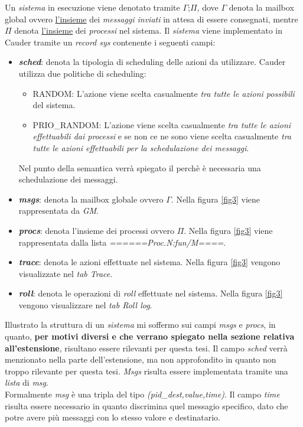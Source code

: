 \documentclass[background.tex]{subfiles}
\begin{document}
Un \textit{sistema} in esecuzione viene denotato tramite $\Gamma$;$\Pi$, dove $\Gamma$ denota la mailbox global ovvero \underline{l'insieme} dei \textit{messaggi inviati} in attesa di essere consegnati, mentre $\Pi$ denota \underline{l'insieme} dei \textit{processi} nel sistema.
Il \textit{sistema} viene implementato in Cauder tramite un \textit{record sys} contenente i seguenti campi:
	\begin{itemize}
		\item \textit{\textbf{sched}}: denota la tipologia di scheduling delle azioni da utilizzare. Cauder utilizza due politiche di scheduling:
			\begin{itemize}
				\item RANDOM: L'azione viene scelta casualmente \textit{tra tutte le azioni possibili} del sistema.
				\item PRIO\_RANDOM: L'azione viene scelta casualmente \textit{tra tutte le azioni effettuabili dai processi} e se non ce ne sono viene scelta casualmente \textit{tra tutte le azioni effettuabili per la schedulazione dei messaggi}.
			\end{itemize}
			Nel punto della semantica verrà spiegato il perchè è necessaria una schedulazione dei messaggi.
		\item \textit{\textbf{msgs}}: denota la mailbox globale ovvero $\Gamma$. Nella figura \ref{fig3} viene rappresentata da \textit{GM}.
		\item \textit{\textbf{procs}}: denota l'insieme dei processi ovvero $\Pi$. Nella figura \ref{fig3} viene rappresentata dalla lista \textit{======Proc.N:fun/M====}.
		\item \textit{\textbf{trace}}: denota le azioni effettuate nel sistema. Nella figura \ref{fig3} vengono visualizzate nel \textit{tab Trace}.
		\item \textit{\textbf{roll}}: denota le operazioni di \textit{roll} effettuate nel sistema. Nella figura \ref{fig3} vengono visualizzare nel \textit{tab Roll log}.
	\end{itemize}
Illustrato la struttura di un \textit{sistema} mi soffermo sui campi \textit{msgs} e \textit{procs}, in quanto, \textbf{per motivi diversi e che verrano spiegato nella sezione relativa all'estensione}, risultano essere rilevanti per questa tesi.
Il campo \textit{sched} verrà menzionato nella parte dell'estensione, ma non approfondito in quanto non troppo rilevante per questa tesi.
\textit{Msgs} risulta essere implementata tramite una \textit{lista} di \textit{msg}.\\
Formalmente \textit{msg} è una tripla del tipo \textit{(pid\_dest,value,time)}. Il campo \textit{time} risulta essere necessario in quanto discrimina quel messagio specifico, dato che potre avere più messaggi con lo stesso valore e destinatario.
\end{document}
